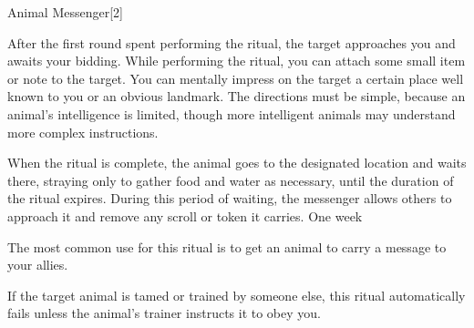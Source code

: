 \begin{spellsection}{Animal Messenger}[2]
    \begin{spellheader}
    \end{spellheader}
    \begin{spellcontent}
        \begin{spelltargetinginfo}
            \spellrng{\rnglong}
        \end{spelltargetinginfo}
        \begin{spelleffects}
            \spellspecial After the first round spent performing the ritual, the target approaches you and awaits your bidding. While performing the ritual, you can attach some small item or note to the target.
            \spelleffect  You can mentally impress on the target a certain place well known to you or an obvious landmark. The directions must be simple, because an animal's intelligence is limited, though more intelligent animals may understand more complex instructions.

            When the ritual is complete, the animal goes to the designated location and waits there, straying only to gather food and water as necessary, until the duration of the ritual expires. During this period of waiting, the messenger allows others to approach it and remove any scroll or token it carries.
            \spelldur One week
        \end{spelleffects}
    \end{spellcontent}
    \begin{spellfooter}
        \spellnotes The most common use for this ritual is to get an animal to carry a message to your allies.

        If the target animal is tamed or trained by someone else, this ritual automatically fails unless the animal's trainer instructs it to obey you.
    \end{spellfooter}
    \begin{spellaugments}
    \end{spellaugments}
\end{spellsection}

